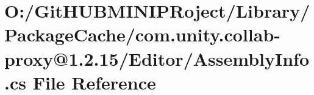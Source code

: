 \hypertarget{com_8unity_8collab-proxy_0D1_82_815_2_editor_2_assembly_info_8cs}{}\section{O\+:/\+Git\+H\+U\+B\+M\+I\+N\+I\+P\+Roject/\+Library/\+Package\+Cache/com.unity.\+collab-\/proxy@1.2.15/\+Editor/\+Assembly\+Info.cs File Reference}
\label{com_8unity_8collab-proxy_0D1_82_815_2_editor_2_assembly_info_8cs}
